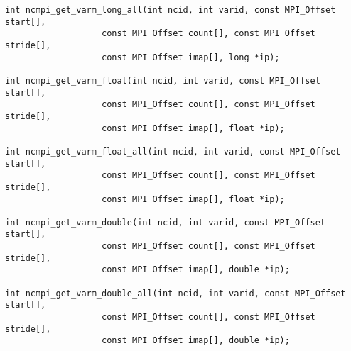 \begin{verbatim}
int ncmpi_get_varm_long_all(int ncid, int varid, const MPI_Offset start[],
                   const MPI_Offset count[], const MPI_Offset stride[],
                   const MPI_Offset imap[], long *ip); 

int ncmpi_get_varm_float(int ncid, int varid, const MPI_Offset start[],
                   const MPI_Offset count[], const MPI_Offset stride[],
                   const MPI_Offset imap[], float *ip); 

int ncmpi_get_varm_float_all(int ncid, int varid, const MPI_Offset start[],
                   const MPI_Offset count[], const MPI_Offset stride[],
                   const MPI_Offset imap[], float *ip); 

int ncmpi_get_varm_double(int ncid, int varid, const MPI_Offset start[],
                   const MPI_Offset count[], const MPI_Offset stride[],
                   const MPI_Offset imap[], double *ip);

int ncmpi_get_varm_double_all(int ncid, int varid, const MPI_Offset start[],
                   const MPI_Offset count[], const MPI_Offset stride[],
                   const MPI_Offset imap[], double *ip); 
\end{verbatim}
